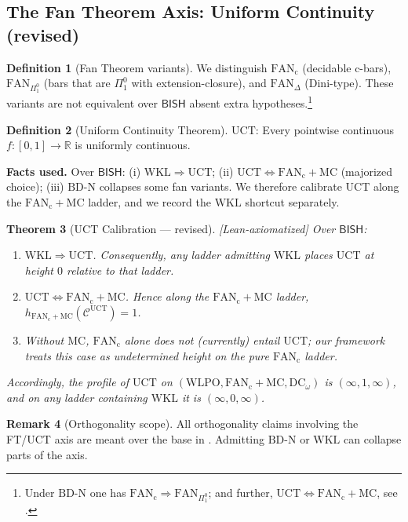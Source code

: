 \documentclass[11pt]{article}
\theoremstyle{plain}
\newtheorem{theorem}{Theorem}[section]
\theoremstyle{definition}
\newtheorem{definition}[theorem]{Definition}
\newtheorem{remark}[theorem]{Remark}
\newcommand{\R}{\mathbb{R}}
\newcommand{\WLPO}{\mathrm{WLPO}}
\newcommand{\DCw}{\mathrm{DC}_\omega}
\newcommand{\UCT}{\mathrm{UCT}}
\newcommand{\BISH}{\mathsf{BISH}}
\newcommand{\BDN}{\mathrm{BD\mbox{-}N}}
\newcommand{\MC}{\mathrm{MC}}            %
\newcommand{\WKL}{\mathrm{WKL}}
\newcommand{\FTc}{\mathrm{FAN}_{\mathrm{c}}}  %
\newcommand{\FANPiO}{\mathrm{FAN}_{\Pi^0_1}}
\newcommand{\FANDelta}{\mathrm{FAN}_{\Delta}}
\newcommand{\leanaxiom}{\textsf{\textcolor{orange!80!black}{[Lean-axiomatized]}}}
\begin{document}
\subsection{The Fan Theorem Axis: Uniform Continuity (revised)}\label{subsec:uct-revised}

\begin{definition}[Fan Theorem variants]\label{def:fan-variants}
We distinguish \(\FTc\) (decidable c-bars), \(\FANPiO\) (bars that are \(\Pi^0_1\) with extension-closure), and \(\FANDelta\) (Dini-type). These variants are not equivalent over \(\BISH\) absent extra hypotheses.\footnote{Under \(\BDN\) one has \(\FTc \Rightarrow \FANPiO\); and further, \(\UCT \iff \FTc+\MC\), see .}
\end{definition}

\begin{definition}[Uniform Continuity Theorem]\label{def:uct-restate}
\(\UCT\): Every pointwise continuous \(f:[0,1]\to\R\) is uniformly continuous.
\end{definition}

\begin{warningbox}
\textbf{Facts used.} Over \(\BISH\): (i) \(\WKL \Rightarrow \UCT\); (ii) \(\UCT \iff \FTc+\MC\) (majorized choice); (iii) \(\BDN\) collapses some fan variants. We therefore calibrate \(\UCT\) along the \(\FTc+\MC\) ladder, and we record the \(\WKL\) shortcut separately.
\end{warningbox}

\begin{theorem}[UCT Calibration --- revised]\label{thm:uct-calib-revised} \leanaxiom
Over \(\BISH\):
\begin{enumerate}
  \item \(\WKL \Rightarrow \UCT\). Consequently, any ladder admitting \(\WKL\) places \(\UCT\) at height \(0\) relative to that ladder.
  \item \(\UCT \iff \FTc+\MC\). Hence along the \(\FTc+\MC\) ladder, \(h_{\FTc+\MC}(\mathcal{C}^{\UCT})=1\).
  \item Without \(\MC\), \(\FTc\) alone does not (currently) entail \(\UCT\); our framework treats this case as \emph{undetermined height} on the pure \(\FTc\) ladder.
\end{enumerate}
Accordingly, the profile of \(\UCT\) on \((\WLPO,\FTc+\MC,\DCw)\) is \((\infty,1,\infty)\), and on any ladder containing \(\WKL\) it is \((\infty,0,\infty)\).
\end{theorem}

\begin{remark}[Orthogonality scope]\label{rem:ft-orth-scope}
All orthogonality claims involving the FT/UCT axis are meant over the base in . Admitting \(\BDN\) or \(\WKL\) can collapse parts of the axis.
\end{remark}
\end{document}
